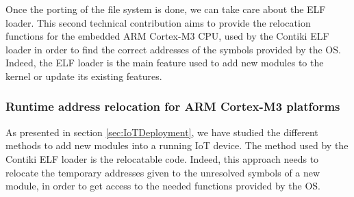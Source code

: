 

Once the porting of the file system is done, we can take care about the ELF loader.
This second technical contribution aims to provide the relocation functions for the embedded ARM Cortex-M3 CPU, used by the Contiki ELF loader in order to find the correct addresses of the symbols provided by the OS.
Indeed, the ELF loader is the main feature used to add new modules to the kernel or update its existing features.

\subsubsection{Runtime address relocation for ARM Cortex-M3 platforms}
As presented in section \ref{sec:IoTDeployment}, we have studied the different methods to add new modules into a running IoT device.
The method used by the Contiki ELF loader is the relocatable code.
Indeed, this approach needs to relocate the temporary addresses given to the unresolved symbols of a new module, in order to get access to the needed functions provided by the OS.

